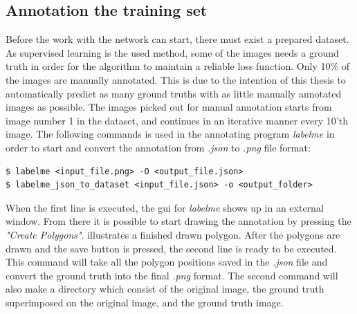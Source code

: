 \documentclass[USenglish]{ifimaster}  %
\begin{document}
\subsection{Annotation the training set}
Before the work with the network can start, there must exist a prepared dataset. As supervised learning is the used method, some of the images needs a ground truth in order for the algorithm to maintain a reliable loss function. Only 10\% of the images are manually annotated. This is due to the intention of this thesis to automatically predict as many ground truths with as little manually annotated images as possible. The images picked out for manual annotation starts from image number 1 in the dataset, and continues in an iterative manner every 10'th image. The following commands is used in the annotating program \textit{labelme} in order to start and convert the annotation from \textit{.json} to \textit{.png} file format:   

\begin{verbatim}
$ labelme <input_file.png> -O <output_file.json>
$ labelme_json_to_dataset <input_file.json> -o <output_folder>
\end{verbatim}

When the first line is executed, the \ac{gui} for \textit{labelme} shows up in an external window. From there it is possible to start drawing the annotation by pressing the \textit{"Create Polygons"}.  illustrates a finished drawn polygon. After the polygons are drawn and the save button is pressed, the second line is ready to be executed. This command will take all the polygon positions saved in the \textit{.json} file and convert the ground truth into the final \textit{.png} format. The second command will also make a directory which consist of the original image, the ground truth superimposed on the original image, and the ground truth image. 
\end{document}
